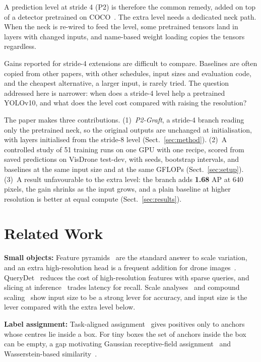 \documentclass[runningheads]{llncs}
\begin{document}
A prediction level at stride 4 (P2) is therefore the common remedy, added on top of a detector pretrained on COCO~\cite{zhu2021tph,yang2022querydet}. The extra level needs a dedicated neck path. When the neck is re-wired to feed the level, some pretrained tensors land in layers with changed inputs, and name-based weight loading copies the tensors regardless.

Gains reported for stride-4 extensions are difficult to compare. Baselines are often copied from other papers, with other schedules, input sizes and evaluation code, and the cheapest alternative, a larger input, is rarely tried. The question addressed here is narrower: when does a stride-4 level help a pretrained YOLOv10, and what does the level cost compared with raising the resolution?

The paper makes three contributions.
(1)~\emph{P2-Graft}, a stride-4 branch reading only the pretrained neck, so the original outputs are unchanged at initialisation, with layers initialised from the stride-8 level (Sect.~\ref{sec:method}).
(2)~A controlled study of 51 training runs on one GPU with one recipe, scored from saved predictions on VisDrone test-dev, with seeds, bootstrap intervals, and baselines at the same input size and at the same GFLOPs (Sect.~\ref{sec:setup}).
(3)~A result unfavourable to the extra level: the branch adds \textbf{1.68} AP at 640 pixels, the gain shrinks as the input grows, and a plain baseline at higher resolution is better at equal compute (Sect.~\ref{sec:results}).

\section{Related Work}
\textbf{Small objects:} Feature pyramids~\cite{lin2017fpn,liu2018panet} are the standard answer to scale variation, and an extra high-resolution head is a frequent addition for drone images~\cite{zhu2021tph}. QueryDet~\cite{yang2022querydet} reduces the cost of high-resolution features with sparse queries, and slicing at inference~\cite{akyon2022sahi} trades latency for recall. Scale analyses~\cite{singh2018snip} and compound scaling~\cite{tan2019efficientnet} show input size to be a strong lever for accuracy, and input size is the lever compared with the extra level below.

\textbf{Label assignment:} Task-aligned assignment~\cite{feng2021tood} gives positives only to anchors whose centres lie inside a box. For tiny boxes the set of anchors inside the box can be empty, a gap motivating Gaussian receptive-field assignment~\cite{xu2022rfla} and Wasserstein-based similarity~\cite{wang2021nwd}.
\end{document}
